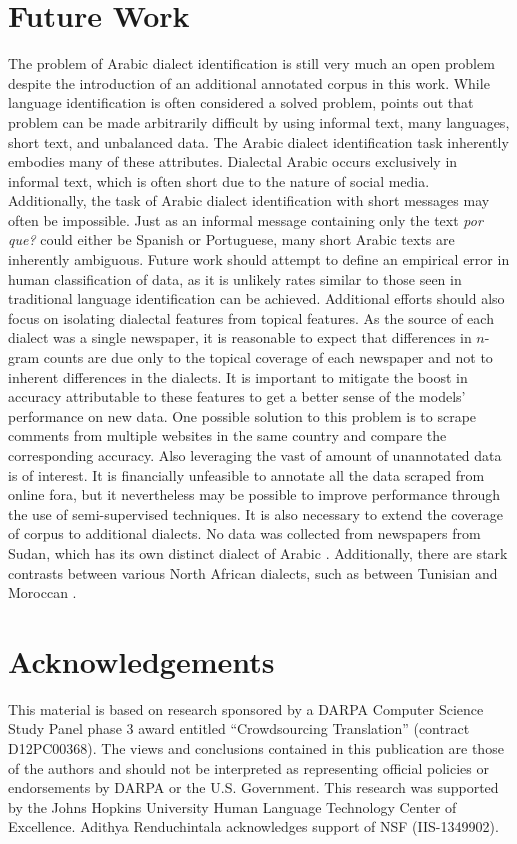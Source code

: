 \documentclass[10pt, a4paper]{article}
\begin{document}
\section{Future Work} The problem of Arabic dialect identification is
still very much an open problem despite the introduction of an
additional annotated corpus in this work. While language identification is often
considered a solved problem,  points out
that problem can be made arbitrarily difficult by using informal text,
many languages, short text, and unbalanced data. The Arabic dialect
identification
task inherently embodies many of these attributes. Dialectal Arabic
occurs exclusively in informal text, which is often short due to the
nature of social media. Additionally, the task of Arabic dialect
identification with short messages may often be impossible. Just as an
informal message containing only the text \textit{por que?} could
either be Spanish or Portuguese, many short Arabic texts are
inherently ambiguous. Future work should attempt to define an
empirical error in human classification of data, as it is unlikely
rates similar to those seen in traditional language identification can be achieved. 
Additional efforts should also focus on isolating dialectal features from topical
features. As the source of each dialect was a single newspaper, it is
reasonable to expect that differences in $n$-gram counts are due only to
the topical coverage of each newspaper and not to inherent
differences in the dialects. It is important to mitigate the boost in accuracy attributable
to these features to get a better sense of the models' performance on
new data. One possible solution to this problem is to scrape comments
from multiple websites in the same country and compare the
corresponding accuracy. Also leveraging the vast of amount of
unannotated data is of interest. It is financially unfeasible to
annotate all the data scraped from online fora, but it nevertheless
may be possible to improve performance through the use of
semi-supervised techniques. It is also necessary to extend the
coverage of corpus to additional dialects. No data was collected from
newspapers from Sudan, which has its own distinct dialect of Arabic
\cite{comrie2013major}. Additionally, there are stark contrasts
between various North African dialects, such as between Tunisian and
Moroccan \cite{comrie2013major}.

\section*{Acknowledgements}
This material is based on research sponsored by a DARPA Computer Science Study Panel phase 3 award entitled ``Crowdsourcing Translation'' (contract D12PC00368). The views and conclusions contained in this publication are those of the authors and should not be interpreted as representing official policies or endorsements by DARPA or the U.S. Government. This research was supported by the Johns Hopkins University Human Language Technology Center of Excellence. Adithya Renduchintala acknowledges support of NSF (IIS-1349902).


\nocite{*}


\end{document}
